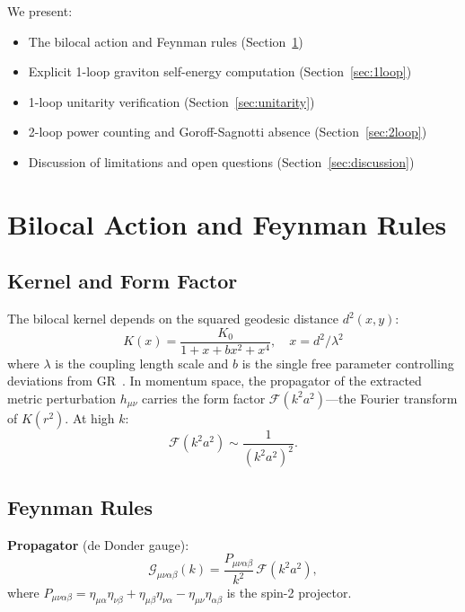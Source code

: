 \documentclass[aps,prd,reprint,nofootinbib]{revtex4-2}
\begin{document}
We present:
\begin{itemize}
\item The bilocal action and Feynman rules (Section~\ref{sec:action})
\item Explicit 1-loop graviton self-energy computation (Section~\ref{sec:1loop})
\item 1-loop unitarity verification (Section~\ref{sec:unitarity})
\item 2-loop power counting and Goroff-Sagnotti absence (Section~\ref{sec:2loop})
\item Discussion of limitations and open questions (Section~\ref{sec:discussion})
\end{itemize}

\section{Bilocal Action and Feynman Rules}
\label{sec:action}

\subsection{Kernel and Form Factor}

The bilocal kernel depends on the squared geodesic distance $d^2(x,y)$:
\begin{equation}
K(x) = \frac{K_0}{1 + x + b x^2 + x^4},\quad x = d^2/\lambda^2
\label{eq:kernel}
\end{equation}
where $\lambda$ is the coupling length scale and $b$ is the single free parameter controlling deviations from GR~\cite{TRM_V4_Paper}. In momentum space, the propagator of the extracted metric perturbation $h_{\mu\nu}$ carries the form factor $\mathcal{F}(k^2 a^2)$---the Fourier transform of $K(r^2)$. At high $k$:
\begin{equation}
\mathcal{F}(k^2 a^2) \sim \frac{1}{(k^2 a^2)^2}.
\label{eq:formfactor}
\end{equation}

\subsection{Feynman Rules}

\textbf{Propagator} (de Donder gauge):
\begin{equation}
\mathcal{G}_{\mu\nu\alpha\beta}(k) = \frac{P_{\mu\nu\alpha\beta}}{k^2}\,\mathcal{F}(k^2 a^2),
\label{eq:propagator}
\end{equation}
where $P_{\mu\nu\alpha\beta} = \eta_{\mu\alpha}\eta_{\nu\beta} + \eta_{\mu\beta}\eta_{\nu\alpha} - \eta_{\mu\nu}\eta_{\alpha\beta}$ is the spin-2 projector.
\end{document}
